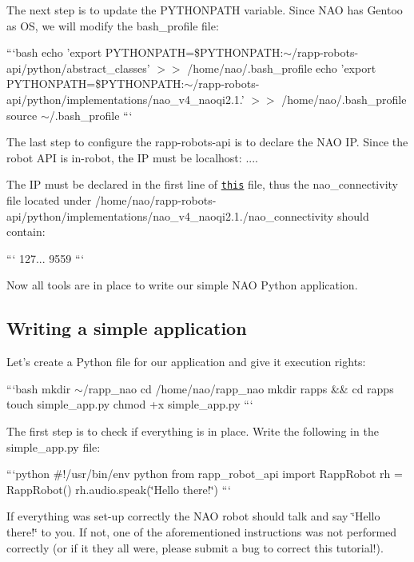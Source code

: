 The next step is to update the {\ttfamily P\-Y\-T\-H\-O\-N\-P\-A\-T\-H} variable. Since N\-A\-O has Gentoo as O\-S, we will modify the {\ttfamily bash\-\_\-profile} file\-:

```bash echo 'export P\-Y\-T\-H\-O\-N\-P\-A\-T\-H=\$\-P\-Y\-T\-H\-O\-N\-P\-A\-T\-H\-:$\sim$/rapp-\/robots-\/api/python/abstract\-\_\-classes' $>$$>$ /home/nao/.bash\-\_\-profile echo 'export P\-Y\-T\-H\-O\-N\-P\-A\-T\-H=\$\-P\-Y\-T\-H\-O\-N\-P\-A\-T\-H\-:$\sim$/rapp-\/robots-\/api/python/implementations/nao\-\_\-v4\-\_\-naoqi2.1.' $>$$>$ /home/nao/.bash\-\_\-profile source $\sim$/.bash\-\_\-profile ```

The last step to configure the {\ttfamily rapp-\/robots-\/api} is to declare the N\-A\-O I\-P. Since the robot A\-P\-I is in-\/robot, the I\-P must be localhost\-: {...}.

The I\-P must be declared in the first line of \href{https://github.com/rapp-project/rapp-robots-api/blob/master/python/implementations/nao_v4_naoqi2.1.4/nao_connectivity}{\tt this} file, thus the {\ttfamily nao\-\_\-connectivity} file located under {\ttfamily /home/nao/rapp-\/robots-\/api/python/implementations/nao\-\_\-v4\-\_\-naoqi2.1./nao\-\_\-connectivity} should contain\-:

``` 127... 9559 ```

Now all tools are in place to write our simple N\-A\-O Python application.

\subsection*{Writing a simple application}

Let's create a Python file for our application and give it execution rights\-:

```bash mkdir $\sim$/rapp\-\_\-nao cd /home/nao/rapp\-\_\-nao mkdir rapps \&\& cd rapps touch simple\-\_\-app.\-py chmod +x simple\-\_\-app.\-py ```

The first step is to check if everything is in place. Write the following in the {\ttfamily simple\-\_\-app.\-py} file\-:

```python \#!/usr/bin/env python from rapp\-\_\-robot\-\_\-api import Rapp\-Robot rh = Rapp\-Robot() rh.\-audio.\-speak(\char`\"{}\-Hello there!\char`\"{}) ```

If everything was set-\/up correctly the N\-A\-O robot should talk and say \char`\"{}\-Hello there!\char`\"{} to you. If not, one of the aforementioned instructions was not performed correctly (or if it they all were, please submit a bug to correct this tutorial!).

